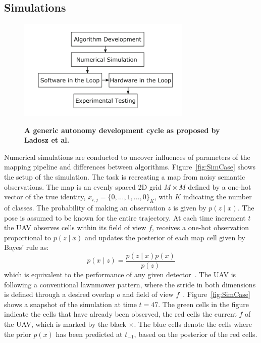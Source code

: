 \documentclass[twocolumn,letterpaper]{IEEEAerospaceCLS}  %
\begin{document}
\subsection{Simulations} \label{ssec:MetSim}
\begin{figure}
    \centering
    \includegraphics[width=3.25in]{2-3DevelopmentCycle.png}\\
    \caption{\bf{A generic autonomy development cycle as proposed by Ladosz et al.~\protect\cite{ladosz_generic_2019}}}
    \label{fig:DevProcess}
\end{figure}
Numerical simulations are conducted to uncover influences of parameters of the mapping pipeline and differences between algorithms. Figure~\ref{fig:SimCase} shows the setup of the simulation. The task is recreating a map from noisy semantic observations. The map is an evenly spaced 2D grid $M \times M$ defined by a one-hot vector of the true identity, $x_{i,j} = \{0,..., 1, ..., 0\}_K$, with $K$ indicating the number of classes. The probability of making an observation $z$ is given by $p(z\mid x)$. The pose is assumed to be known for the entire trajectory. At each time increment $t$ the UAV observes cells within its field of view $f$, receives a one-hot observation proportional to $p(z\mid x)$ and updates the posterior of each map cell given by Bayes' rule as:
\begin{equation} \label{eq:Bayes}
    p(x\mid z) = \frac{p(z\mid x) p(x)}{p(z)}
\end{equation}
which is equivalent to the performance of any given detector~\cite{alom_history_2018}.
The UAV is following a conventional lawnmower pattern, where the stride in both dimensions is defined through a desired overlap $o$ and field of view $f$~\cite{shetty_implementation_2020}. Figure~\ref{fig:SimCase} shows a snapshot of the simulation at time $t=47$. The green cells in the figure indicate the cells that have already been observed, the red cells the current $f$ of the UAV, which is marked by the black $\times$. The blue cells denote the cells where the prior $p(x)$ has been predicted at $t_{-1}$, based on the posterior of the red cells.\\ 
\end{document}
